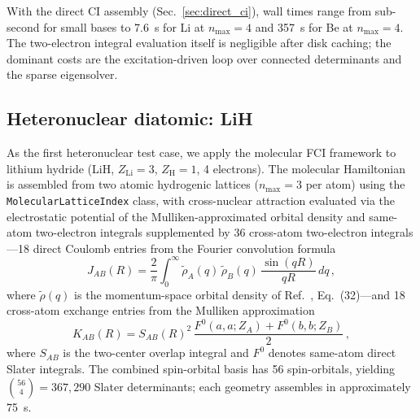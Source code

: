 \documentclass[aps,pra,twocolumn,superscriptaddress,longbibliography,floatfix]{revtex4-2}
\begin{document}
With the direct CI assembly (Sec.~\ref{sec:direct_ci}), wall times
range from sub-second for small bases to 7.6~s for Li at $n_{\max}=4$
and 357~s for Be at $n_{\max}=4$.
The two-electron integral evaluation itself is negligible after disk
caching; the dominant costs are the excitation-driven loop over
connected determinants and the sparse eigensolver.

\subsection{Heteronuclear diatomic: LiH}
\label{sec:lih}

As the first heteronuclear test case, we apply the molecular FCI framework
to lithium hydride (LiH, $Z_{\text{Li}}=3$, $Z_{\text{H}}=1$, 4 electrons).
The molecular Hamiltonian is assembled from two atomic hydrogenic lattices
($n_{\max}=3$ per atom) using the \texttt{MolecularLatticeIndex} class,
with cross-nuclear attraction evaluated via the electrostatic potential of
the Mulliken-approximated orbital density and same-atom two-electron
integrals supplemented by 36 cross-atom two-electron integrals---18
direct Coulomb entries from the Fourier convolution formula
\begin{equation}
J_{AB}(R) = \frac{2}{\pi} \int_0^\infty
\tilde{\rho}_A(q)\,\tilde{\rho}_B(q)\,
\frac{\sin(qR)}{qR}\,dq\,,
\label{eq:jab}
\end{equation}
where $\tilde{\rho}(q)$ is the momentum-space orbital density of
Ref.~\cite{Loutey2026c}, Eq.~(32)---and 18 cross-atom exchange entries
from the Mulliken approximation
\begin{equation}
K_{AB}(R) = S_{AB}(R)^2 \,\frac{F^0(a,a;Z_A) + F^0(b,b;Z_B)}{2}\,,
\label{eq:kab}
\end{equation}
where $S_{AB}$ is the two-center overlap integral and $F^0$ denotes
same-atom direct Slater integrals.
The combined spin-orbital basis has 56 spin-orbitals, yielding
$\binom{56}{4} = 367{,}290$ Slater determinants; each geometry assembles
in approximately 75~s.
\end{document}
